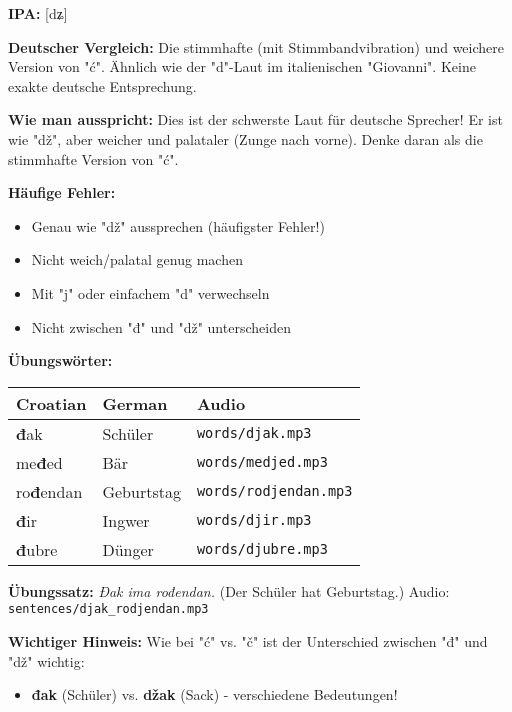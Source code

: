\begin{tcolorbox}[colback=lightblue!30, colframe=croatianblue, title=\textbf{Đ, đ}]

\textbf{IPA:} [dʑ]

\textbf{Deutscher Vergleich:}
Die stimmhafte (mit Stimmbandvibration) und weichere Version von "ć". Ähnlich wie der "d"-Laut im italienischen "Giovanni". Keine exakte deutsche Entsprechung.

\textbf{Wie man ausspricht:}
Dies ist der schwerste Laut für deutsche Sprecher! Er ist wie "dž", aber weicher und palataler (Zunge nach vorne). Denke daran als die stimmhafte Version von "ć".

\textbf{Häufige Fehler:}
\begin{itemize}
    \item Genau wie "dž" aussprechen (häufigster Fehler!)
    \item Nicht weich/palatal genug machen
    \item Mit "j" oder einfachem "d" verwechseln
    \item Nicht zwischen "đ" und "dž" unterscheiden
\end{itemize}

\textbf{Übungswörter:}
\begin{tabular}{lll}
\textbf{Croatian} & \textbf{German} & \textbf{Audio} \\
\midrule
\textbf{đ}ak & Schüler & \texttt{words/djak.mp3} \\
me\textbf{đ}ed & Bär & \texttt{words/medjed.mp3} \\
ro\textbf{đ}endan & Geburtstag & \texttt{words/rodjendan.mp3} \\
\textbf{đ}ir & Ingwer & \texttt{words/djir.mp3} \\
\textbf{đ}ubre & Dünger & \texttt{words/djubre.mp3} \\
\end{tabular}

\textbf{Übungssatz:}
\textit{Đak ima rođendan.}
(Der Schüler hat Geburtstag.)
Audio: \texttt{sentences/djak\_rodjendan.mp3}

\textbf{Wichtiger Hinweis:}
Wie bei "ć" vs. "č" ist der Unterschied zwischen "đ" und "dž" wichtig:
\begin{itemize}
    \item \textbf{đak} (Schüler) vs. \textbf{džak} (Sack) - verschiedene Bedeutungen!
\end{itemize}

\end{tcolorbox}

